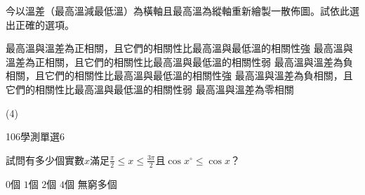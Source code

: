 \begin{QUESTIONS}
\begin{QUESTION}
\begin{QBODY}
        今以溫差（最高溫減最低溫）為橫軸且最高溫為縱軸重新繪製一散佈圖。試依此選出正確的選項。
        \begin{QOPS}
            \QOP 最高溫與溫差為正相關，且它們的相關性比最高溫與最低溫的相關性強
            \QOP 最高溫與溫差為正相關，且它們的相關性比最高溫與最低溫的相關性弱
            \QOP 最高溫與溫差為負相關，且它們的相關性比最高溫與最低溫的相關性強
            \QOP 最高溫與溫差為負相關，且它們的相關性比最高溫與最低溫的相關性弱
            \QOP 最高溫與溫差為零相關
        \end{QOPS}
        \end{QBODY}
        \begin{QFROMS}
        \end{QFROMS}
        \begin{QTAGS}
        \end{QTAGS}
        \begin{QANS}
            (4)
        \end{QANS}
        \begin{QSOL}
        \end{QSOL}
        \begin{QEMPTYSPACE}
        \end{QEMPTYSPACE}
    \end{QUESTION}
    \begin{QUESTION}
        \begin{ExamInfo}{106}{學測}{單選}{6}
        \end{ExamInfo}
        \begin{QBODY}
            試問有多少個實數$x$滿足$\frac{\pi }{2}\le x\le \frac{3\pi }{2}$且$\cos x{}^\circ \le \cos x$？
        \begin{QOPS}
            \QOP $0$個     
            \QOP $1$個     
            \QOP $2$個     
            \QOP $4$個     
            \QOP 無窮多個
        \end{QOPS}
        \end{QBODY}
        \begin{QFROMS}
        \end{QFROMS}
        \begin{QTAGS}
        \end{QTAGS}
        \begin{QANS}
        \end{QANS}
        \begin{QSOL}
        \end{QSOL}
        \begin{QEMPTYSPACE}
        \end{QEMPTYSPACE}

\end{QUESTION}
\end{QUESTIONS}
